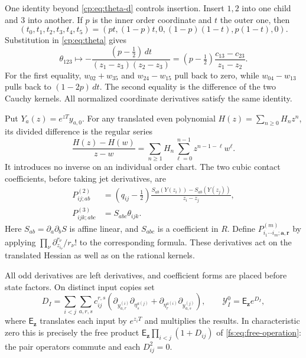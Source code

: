 One identity beyond \eqref{cp:eq:theta-d} controls insertion.
Insert \(1,2\) into one child and \(3\) into another.  If \(p\)
is the inner order coordinate and \(t\) the outer one, then
\[
 (t_0,t_1,t_2,t_3,t_4,t_5)
   =(pt,(1-p)t,0,(1-p)(1-t),p(1-t),0).
\]
Substitution in \eqref{cp:eq:theta} gives
\begin{equation}\label{cp:eq:theta-tree}
 \theta_{123}\longmapsto
 -\frac{(p-\tfrac12)\,dt}{(z_1-z_3)(z_2-z_3)}
 =(p-\tfrac12)\frac{c_{13}-c_{23}}{z_1-z_2}.
\end{equation}
For the first equality, \(w_{02}+w_{35}\) and \(w_{24}-w_{15}\)
pull back to zero, while \(w_{04}-w_{13}\) pulls back to
\((1-2p)\,dt\).  The second equality is the difference of the two
Cauchy kernels.  All normalized coordinate derivatives satisfy the
same identity.

Put \(Y_a(z)=e^{zT}y_{a,0}\).  For any translated even polynomial
\(H(z)=\sum_{n\geq0}H_nz^n\), its divided difference is the regular
series
\begin{equation}\label{cp:eq:divided}
 \frac{H(z)-H(w)}{z-w}
 =\sum_{n\geq1}H_n\sum_{\ell=0}^{n-1}z^{n-1-\ell}w^\ell.
\end{equation}
It introduces no inverse on an individual order chart.
The two cubic contact coefficients, before taking jet derivatives,
are
\begin{equation}\label{cp:eq:contacts}
 \begin{split}
 P^{(2)}_{ij;ab}
   &=(q_{ij}-\tfrac12)
       \frac{S_{ab}(Y(z_i))-S_{ab}(Y(z_j))}{z_i-z_j},\\
 P^{(3)}_{ijk;abc}&=S_{abc}\theta_{ijk}.
 \end{split}
\end{equation}
Here \(S_{ab}=\partial_a\partial_bS\) is affine linear, and
\(S_{abc}\) is a coefficient in \(R\).  Define
\(P^{(m)}_{i_1\cdots i_m;\mathbf a,\mathbf r}\) by applying
\(\prod_\nu\partial_{z_{i_\nu}}^{r_\nu}/r_\nu!\) to the corresponding
formula.  These derivatives act on the translated Hessian as well
as on the rational kernels.

All odd derivatives are left derivatives, and coefficient forms
are placed before state factors.  On distinct input copies set
\begin{equation}\label{cp:eq:wick}
 D_I=\sum_{i<j}\sum_{a,r,s}c_{ij}^{r,s}
 \left(
 \partial_{y_{a,r}^{(i)}}\partial_{\eta_s^{a(j)}}
 +\partial_{\eta_r^{a(i)}}\partial_{y_{a,s}^{(j)}}
 \right),
 \qquad
 \mathcal Y_I^0=\mathsf E_{\mathbf z}e^{D_I},
\end{equation}
where \(\mathsf E_{\mathbf z}\) translates each input by \(e^{z_iT}\)
and multiplies the results.  In characteristic zero this is precisely
the free product \(\mathsf E_{\mathbf z}\prod_{i<j}(1+D_{ij})\)
of \eqref{fs:eq:free-operation}: the pair operators commute and
each \(D_{ij}^2=0\).

